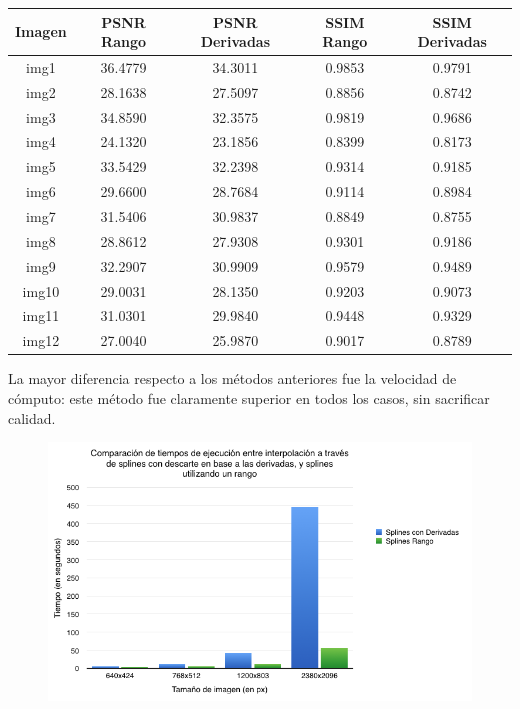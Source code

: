 \documentclass[a4paper]{article}
\begin{document}
\begin{center}
\begin{tabular}{  | c || c | c | c | c | }
 \hline
 Imagen & PSNR Rango & PSNR Derivadas & SSIM Rango & SSIM Derivadas\\
\hline
\hline
 img1 & 36.4779 & 34.3011 & 0.9853 & 0.9791\\
 \hline
 img2 & 28.1638 & 27.5097 & 0.8856 & 0.8742\\
 \hline  
  img3 & 34.8590 & 32.3575 & 0.9819 & 0.9686\\
 \hline  
  img4 & 24.1320 & 23.1856 & 0.8399 & 0.8173\\
 \hline  
  img5 & 33.5429 & 32.2398 & 0.9314 & 0.9185\\
 \hline  
  img6 & 29.6600 & 28.7684 & 0.9114 & 0.8984\\
 \hline  
  img7 & 31.5406 & 30.9837 & 0.8849 & 0.8755\\
 \hline  
  img8 & 28.8612 & 27.9308 & 0.9301 & 0.9186\\
 \hline  
  img9 & 32.2907 & 30.9909 & 0.9579 & 0.9489\\
 \hline  
  img10 & 29.0031 & 28.1350 & 0.9203 & 0.9073\\
 \hline  
  img11 & 31.0301 & 29.9840 & 0.9448 & 0.9329\\
 \hline  
  img12 & 27.0040 & 25.9870 & 0.9017 & 0.8789\\
 \hline  
\end{tabular}
\end{center}

La mayor diferencia respecto a los métodos anteriores fue la velocidad de cómputo: este método fue claramente superior en todos los casos, sin sacrificar calidad.

\begin{figure}[h!]
    \begin{center}
    \includegraphics[scale=0.65]{imagenes/tiempos/derrangg.png}
    \label{tiemposrang}
  \end{center}
\end{figure}
\end{document}

